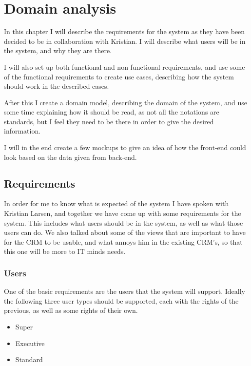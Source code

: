 \chapter{Domain analysis}
\label{chap:domain_analysis}
In this chapter I will describe the requirements for the system as they have
been decided to be in collaboration with Kristian. I will describe what users
will be in the system, and why they are there. 

I will also set up both functional and non functional requirements, and use some
of the functional requirements to create use cases, describing how the system
should work in the described cases. 

After this I create a domain model, describing the domain of the system, and use
some time explaining how it should be read, as not all the notations are
standards, but I feel they need to be there in order to give the desired
information. 

I will in the end create a few mockups to give an idea of how the front-end
could look based on the data given from back-end. 

\section{Requirements}
\label{sec:Requirements}
In order for me to know what is expected of the system I have spoken with
Kristian Larsen, and together we have come up with some requirements for the
system. This includes what users should be in the system, as well as what those
users can do. We also talked about some of the views that are important to have
for the CRM to be usable, and what annoys him in the existing CRM's, so that
this one will be more to IT minds needs. 

\subsection{Users}
\label{sub:Users}

One of the basic requirements are the users that the system will support.
Ideally the following three user types should be supported, each with the rights
of the previous, as well as some rights of their own. 

\begin{itemize}
  \item Super
  \item Executive
  \item Standard
\end{itemize}

